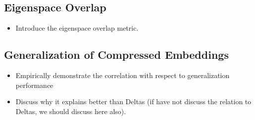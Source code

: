 \subsection{Eigenspace Overlap}
\label{subsec:eigen_overlap}
	\begin{itemize}
		\item Introduce the eigenspace overlap metric.
	\end{itemize}
	
\subsection{Generalization of Compressed Embeddings}
\label{subsec:revisit}
	\begin{itemize}
		\item Empirically demonstrate the correlation with respect to generalization performance
		\item Discuss why it explains better than Deltas (if have not discuss the relation to Deltas, we should discuss here also).
	\end{itemize}
